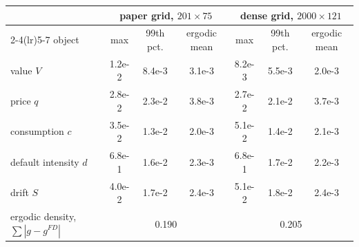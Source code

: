 \begin{tabular}{lcccccc}
\toprule
 & \multicolumn{3}{c}{paper grid, $201\times 75$} & \multicolumn{3}{c}{dense grid, $2000\times 121$} \\
\cmidrule(lr){2-4}\cmidrule(lr){5-7}
object & max & 99th pct. & ergodic mean & max & 99th pct. & ergodic mean \\
\midrule
value $V$ & 1.2e-2 & 8.4e-3 & 3.1e-3 & 8.2e-3 & 5.5e-3 & 2.0e-3 \\
price $q$ & 2.8e-2 & 2.3e-2 & 3.8e-3 & 2.7e-2 & 2.1e-2 & 3.7e-3 \\
consumption $c$ & 3.5e-2 & 1.3e-2 & 2.0e-3 & 5.1e-2 & 1.4e-2 & 2.1e-3 \\
default intensity $d$ & 6.8e-1 & 1.6e-2 & 2.3e-3 & 6.8e-1 & 1.7e-2 & 2.2e-3 \\
drift $S$ & 4.0e-2 & 1.7e-2 & 2.4e-3 & 5.1e-2 & 1.8e-2 & 2.4e-3 \\
\midrule
ergodic density, $\sum|g-g^{FD}|$ & \multicolumn{3}{c}{0.190} & \multicolumn{3}{c}{0.205} \\
\bottomrule
\end{tabular}
